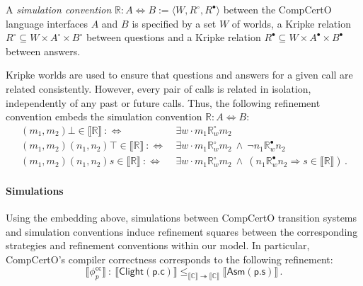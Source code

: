 \documentclass[acmsmall,nonacm]{acmart}
\newcommand{\kw}[1]{\ensuremath{ \mathsf{#1} }}
\newcommand{\que}{\circ}
\newcommand{\ans}{\bullet}
\begin{document}
\begin{definition} \label{def:sconv} %
A \emph{simulation convention}
$\mathbb{R} : A \Leftrightarrow B := \langle W, R^\que, R^\ans \rangle$
between the CompCertO language interfaces $A$ and $B$ is specified by
a set $W$ of worlds,
a Kripke relation $R^\que \subseteq W \times A^\que \times B^\que$
between questions
and
a Kripke relation $R^\ans \subseteq W \times A^\ans \times B^\ans$
between answers.
\end{definition}

Kripke worlds are used to ensure that
questions and answers for a given call
are related consistently.
However, every pair of calls
is related in isolation,
independently of any past or future calls.
Thus, the following
refinement convention
embeds the simulation convention $\mathbb{R} : A \Leftrightarrow B$:
\begin{align*}
  (m_1, m_2) \bot \in \llbracket \mathbb{R} \rrbracket \: :\Leftrightarrow \: {}
   &\exists w \cdot m_1 \mathbb{R}^\que_w m_2
  \\
  (m_1, m_2) (n_1, n_2) \top \in \llbracket \mathbb{R} \rrbracket \::\Leftrightarrow\: {}
   &\exists w \cdot m_1 \mathbb{R}^\que_w m_2 \:\wedge\:
   \neg n_1 \mathbb{R}^\ans_w n_2
  \\
  (m_1, m_2) (n_1, n_2) s \in \llbracket \mathbb{R} \rrbracket \::\Leftrightarrow\: {}
   &\exists w \cdot m_1 \mathbb{R}^\que_w m_2 \:\wedge\:
   (n_1 \mathbb{R}^\ans_w n_2 \Rightarrow s \in \llbracket \mathbb{R} \rrbracket)
  \,.
\end{align*}

\paragraph{Simulations}

Using the embedding above,
simulations between CompCertO transition systems and simulation conventions
induce refinement squares between 
the corresponding strategies and refinement conventions within our model.
In particular,
CompCertO's compiler correctness
corresponds to the following refinement:
\[
  \llbracket \phi_p^\kw{cc} \rrbracket \: : \:
      \llbracket \kw{Clight}(\kw{p.c}) \rrbracket
      \le_{\llbracket \mathbb{C} \rrbracket
        \twoheadrightarrow \llbracket\mathbb{C}\rrbracket}
      \llbracket \kw{Asm}(\kw{p.s}) \rrbracket
  \,.
\]
\end{document}
